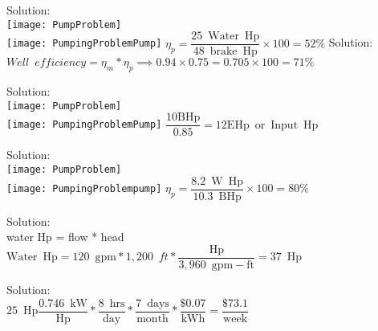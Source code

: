  
 Solution:\\
  \vspace{0.2cm}
 \vspace{0.32cm}\texttt{[image: PumpProblem]}\\
 \vspace{0.2cm}
 \texttt{[image: PumpingProblemPump]}
 \vspace{0.2cm}
$\eta_p=\dfrac{25 \mathrm{\enspace Water \enspace Hp}}{48 \mathrm{\enspace brake \enspace Hp}} \times 100=\boxed{52 \%}$
  \vspace{0.4cm}
 Solution:\\ 
 \vspace{0.2cm}
$Well \enspace efficiency=\eta_m * \eta_p \implies 0.94 \times 0.75=0.705 \times 100=\boxed{71 \%}$
 \vspace{0.2cm}


 Solution:\\
 \vspace{0.4cm}\texttt{[image: PumpProblem]}\\
 \vspace{0.2cm}
 \texttt{[image: PumpingProblemPump]}
 \vspace{0.2cm}
$\dfrac{10 \mathrm{BHp}}{0.85}=\boxed{12 \mathrm{EHp \enspace or \enspace Input \enspace Hp}}$
 \vspace{0.4cm}


  Solution:\\ 
  \vspace{0.2cm}
 \vspace{0.08cm}\texttt{[image: PumpProblem]}\\
 \vspace{0.2cm}
 \texttt{[image: PumpingProblempump]}
 \vspace{0.2cm}
$\eta_p=\dfrac{8.2 \mathrm{\enspace W \enspace Hp}}{10.3 \mathrm{\enspace BHp}} \times 100=\boxed{80 \%}$
 \vspace{0.2cm}


Solution:\\
\vspace{0.4cm}
water Hp = flow * head\\
\vspace{0.4cm}
$\mathrm{Water} \enspace \mathrm{Hp} = 120 \enspace \mathrm{gpm}*1,200 \enspace ft*\dfrac{\mathrm{Hp}}{3,960 \enspace \mathrm{gpm-ft}}=\boxed{ 37 \enspace \mathrm{Hp}}$\\
\vspace{0.2cm}


Solution:\\
\vspace{0.4cm}
$25 \enspace \mathrm{Hp}\dfrac{0.746 \enspace \mathrm{kW}}{\mathrm{Hp}}*\dfrac{8 \enspace \mathrm{hrs}}{\mathrm{day}}*\dfrac{7 \enspace \mathrm{days}}{\mathrm{month}}*\dfrac{\$0.07}{\mathrm{kWh}}=\boxed{\dfrac{\$73.1}{\mathrm{week}}}$\\
\vspace{0.2cm}

